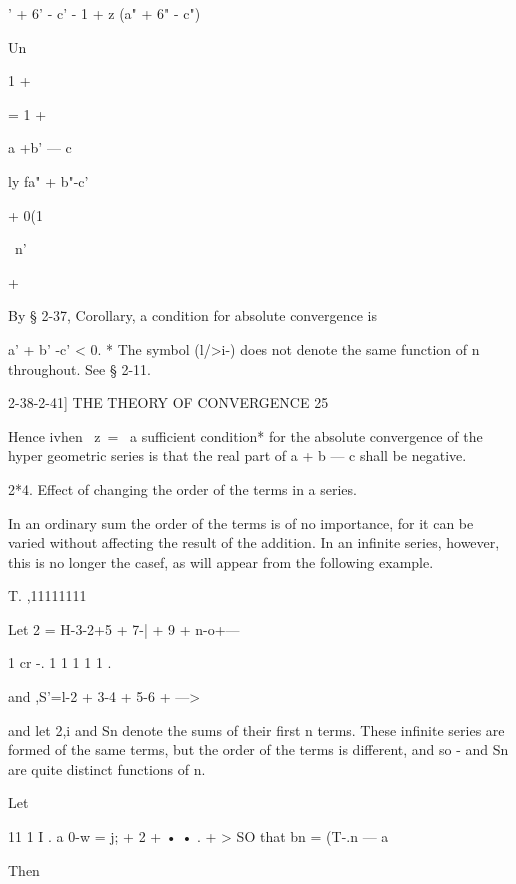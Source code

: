  ' + 6' - c' - 1 + z (a" + 6" - c") 



Un 



1 + 



= 1 + 



a +b' — c 



ly fa" + b"-c' 



+ 0(1 

\ n' 

+ 



  






By § 2-37, Corollary, a condition for absolute convergence is 

a' + b' -c' < 0. 
* The symbol (l/>i-) does not denote the same function of n throughout. See § 2-11. 



2-38-2-41] THE THEORY OF CONVERGENCE 25 

Hence ivhen \ z\ = \, a sufficient condition* for the absolute convergence of 
the hyper geometric series is that the real part of a + b — c shall be negative. 

2*4. Effect of changing the order of the terms in a series. 

In an ordinary sum the order of the terms is of no importance, for it 
can be varied without affecting the result of the addition. In an infinite 
series, however, this is no longer the casef, as will appear from the following 
example. 

T.  ,11111111 

Let 2 = H-3-2+5 + 7-| + 9 + n-o+--- 

1 cr -. 1 1 1 1 1 . 

and ,S'=l-2 + 3-4 + 5-6 + ---> 

and let 2,i and Sn denote the sums of their first n terms. These infinite 
series are formed of the same terms, but the order of the terms is different, 
and so -  and Sn are quite distinct functions of n. 



Let 


11 1 I . a 
0-w = j; + 2 + • • . +   > SO that bn = (T-.n — a 


Then 


